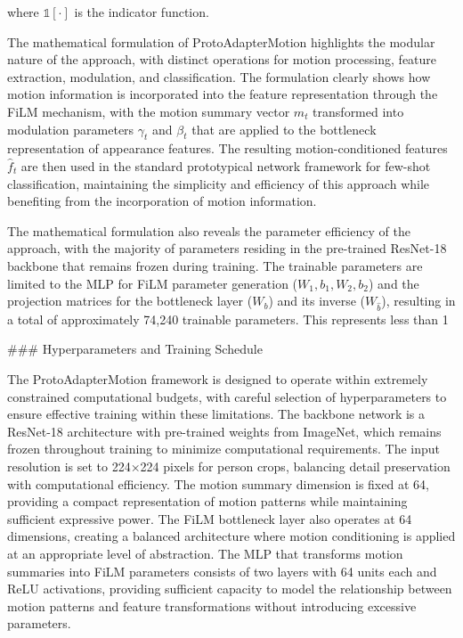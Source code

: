 \documentclass[11pt]{article}
\begin{document}
where $\mathbb{1}[\cdot]$ is the indicator function.

The mathematical formulation of ProtoAdapterMotion highlights the modular nature of the approach, with distinct operations for motion processing, feature extraction, modulation, and classification. The formulation clearly shows how motion information is incorporated into the feature representation through the FiLM mechanism, with the motion summary vector $m_t$ transformed into modulation parameters $\gamma_t$ and $\beta_t$ that are applied to the bottleneck representation of appearance features. The resulting motion-conditioned features $\hat{f}_t$ are then used in the standard prototypical network framework for few-shot classification, maintaining the simplicity and efficiency of this approach while benefiting from the incorporation of motion information.

The mathematical formulation also reveals the parameter efficiency of the approach, with the majority of parameters residing in the pre-trained ResNet-18 backbone that remains frozen during training. The trainable parameters are limited to the MLP for FiLM parameter generation ($W_1, b_1, W_2, b_2$) and the projection matrices for the bottleneck layer ($W_b$) and its inverse ($W_{\hat{b}}$), resulting in a total of approximately 74,240 trainable parameters. This represents less than 1%

### Hyperparameters and Training Schedule

The ProtoAdapterMotion framework is designed to operate within extremely constrained computational budgets, with careful selection of hyperparameters to ensure effective training within these limitations. The backbone network is a ResNet-18 architecture with pre-trained weights from ImageNet, which remains frozen throughout training to minimize computational requirements. The input resolution is set to 224×224 pixels for person crops, balancing detail preservation with computational efficiency. The motion summary dimension is fixed at 64, providing a compact representation of motion patterns while maintaining sufficient expressive power. The FiLM bottleneck layer also operates at 64 dimensions, creating a balanced architecture where motion conditioning is applied at an appropriate level of abstraction. The MLP that transforms motion summaries into FiLM parameters consists of two layers with 64 units each and ReLU activations, providing sufficient capacity to model the relationship between motion patterns and feature transformations without introducing excessive parameters.
\end{document}
